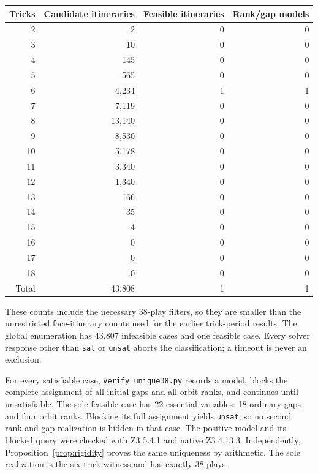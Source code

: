 \documentclass[11pt]{article}
\newcommand{\word}[1]{\texttt{#1}}
\begin{document}
\begin{center}
\begin{tabular}{@{}rrrr@{}}
\toprule
Tricks & Candidate itineraries & Feasible itineraries & Rank/gap models\\
\midrule
2&2&0&0\\
3&10&0&0\\
4&145&0&0\\
5&565&0&0\\
6&4,234&1&1\\
7&7,119&0&0\\
8&13,140&0&0\\
9&8,530&0&0\\
10&5,178&0&0\\
11&3,340&0&0\\
12&1,340&0&0\\
13&166&0&0\\
14&35&0&0\\
15&4&0&0\\
16&0&0&0\\
17&0&0&0\\
18&0&0&0\\
\midrule
Total&43,808&1&1\\
\bottomrule
\end{tabular}
\end{center}

These counts include the necessary 38-play filters, so they are smaller
than the unrestricted face-itinerary counts used for the earlier
trick-period results. The global enumeration has 43,807 infeasible cases
and one feasible case. Every solver response other than \word{sat} or
\word{unsat} aborts the classification; a timeout is never an exclusion.

For every satisfiable case, \word{verify\_unique38.py} records a model,
blocks the complete assignment of all initial gaps and all orbit ranks,
and continues until unsatisfiable. The sole feasible case has 22 essential
variables: 18 ordinary gaps and four orbit ranks. Blocking its full
assignment yields \word{unsat}, so no second rank-and-gap realization is
hidden in that case. The positive model and its blocked query were checked
with Z3 5.4.1 and native Z3 4.13.3. Independently,
Proposition~\ref{prop:rigidity} proves the same uniqueness by arithmetic.
The sole realization is the six-trick witness and has exactly 38 plays.
\end{document}
